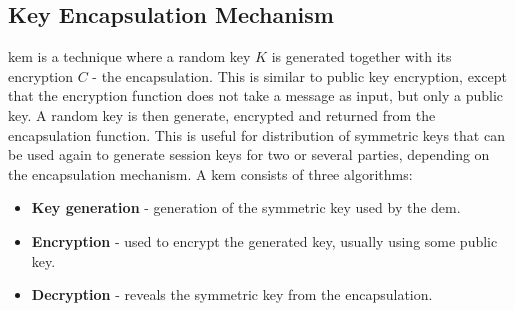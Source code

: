 \subsection{Key Encapsulation Mechanism}
\Gls{kem} \cite{kem_kurosawaP14} is a technique where a random key $K$ is generated together with its encryption $C$ - the encapsulation. This is similar to public key encryption, except that the encryption function does not take a message as input, but only a public key. A random key is then generate, encrypted and returned from the encapsulation function. This is useful for distribution of symmetric keys that can be used again to generate session keys for two or several parties, depending on the encapsulation mechanism. A \gls{kem} consists of three algorithms:
\begin{itemize}
\item \textbf{ Key generation } - generation of the symmetric key used by the \gls{dem}.
\item \textbf{ Encryption } - used to encrypt the generated key, usually using some public key.
\item \textbf{ Decryption } - reveals the symmetric key from the encapsulation.
\end{itemize}


